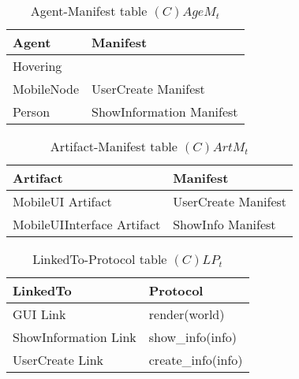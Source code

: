 \begin{table}[H]
	\centering
	\begin{tabular}{|p{4cm}|p{8cm}|}
			\hline
			\textbf{Agent} & \textbf{Manifest} \\
			\hline
			Hovering & \\
			\hline
			MobileNode & UserCreate Manifest \\
			\hline
			Person & ShowInformation Manifest\\
			\hline
		\end{tabular}
	\caption{Agent-Manifest table $(C)AgeM_t$}
	\label{tab:cagemt}
\end{table}

\begin{table}[H]
	\centering
	\begin{tabular}{|p{4cm}|p{8cm}|}
			\hline
			\textbf{Artifact} & \textbf{Manifest} \\
			\hline
			MobileUI Artifact & UserCreate Manifest \\
			\hline
			MobileUIInterface Artifact & ShowInfo Manifest\\
			\hline
		\end{tabular}
	\caption{Artifact-Manifest table $(C)ArtM_t$}
	\label{tab:cartmt}
\end{table}

\begin{table}[H]
	\centering
	\begin{tabular}{|p{4cm}|p{8cm}|}
			\hline
			\textbf{LinkedTo} & \textbf{Protocol} \\
			\hline
			GUI Link & render(world) \\
			\hline
			ShowInformation Link & show\_info(info) \\
			\hline
			UserCreate Link & create\_info(info) \\
			\hline
		\end{tabular}
	\caption{LinkedTo-Protocol table $(C)LP_t$}
	\label{tab:clpt}
\end{table}

